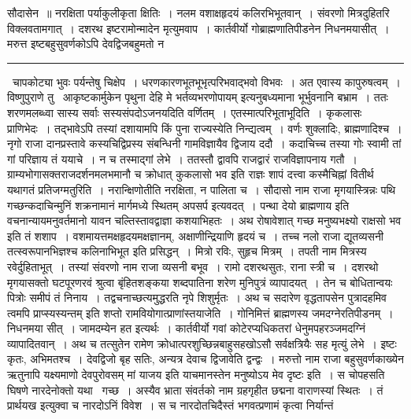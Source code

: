 \documentclass[11pt, openany]{book}
\begin{document}
\newpage

\noindent
सौदासेन~॥ नरक्षिता पर्याकुलीकृता क्षितिः~। नलम वशाक्षहृदयं कलिरभिभूतवान्~। संवरणो मित्रदुहितरि विक्लवतामगात्~। दशरथ इष्टरामोन्मादेन मृत्युमवाप~। कार्तवीर्यो गोब्राह्मणातिपीडनेन निधनमयासीत्~। मरुत्त इष्टबहुसुवर्णकोऽपि देवद्विजबहुमतो न

\vspace{2mm}
\hrule

\noindent
{\ चापकोट्या भुवः पर्यन्तेषु चिक्षेप~। धरणकारणभूतभूभृत्परिभवाद्भवो विभवः~। अत एवास्य कापुरुषत्वम्~। विष्णुपुराणे तु \textendash\ आकृष्टकार्मुकेन पृथुना {\qt देहि मे भर्तव्यभरणोपायम्} इत्यनुबध्यमाना भूर्भुवनानि बभ्राम~। ततः शरणमलब्ध्वा सास्य सर्वाः सस्यसंपदोऽजनयदिति वर्णितम्~। एतस्मात्परिभूताभूदिति~। कृकलासः प्राणिभेदः~। तद्भावेऽपि तस्यां दशायामपि किं पुना राज्यस्येति निन्द्यत्वम्~। वर्णः शुक्लादिः, ब्राह्मणादिश्च~। नृगो राजा दानप्रस्तावे कस्यचिद्विप्रस्य संबन्धिनी गामविज्ञायैव द्विजाय ददौ~। कदाचिच्च तस्या गोः स्वामी तां गां परिज्ञाय तं ययाचे~। न च तस्माद्गां लेभे~। ततस्तौ द्वावपि राजद्वारं राजविज्ञापनाय गतौ~। ग्राम्यभोगासक्तराजदर्शनमलभमानौ च क्रोधात् {\qt कुकलासो भव} इति राज्ञः शापं दत्त्वा कस्मैचिह्नां वितीर्थ यथागतं प्रतिजग्मतुरिति~। नरान्क्षिणोतीति नरक्षिता, न पालिता च~। सौदासो नाम राजा मृगयास्त्रिन्नः पथि गच्छन्कदाचिन्मुनिं शक्रनामानं मार्गमध्ये स्थितम् {\qt अपसर्प} इत्यवदत्~। {\qt पन्था देयो ब्राह्मणाय} इति वचनान्यायमनुवर्तमानो यावन चल्तिस्तावद्वाज्ञा कशयाभिहतः~। अथ रोषावेशात् {\qt गच्छ मनुष्यभक्ष्यो राक्षसो भव} इति तं शशाप~। वशमायत्तमक्षहृदयमक्षज्ञानम्, अक्षाणीन्द्रियाणि हृदयं च~। तच्च नलो राजा द्यूतव्यसनी तत्स्वरूपानभिज्ञश्च कलिनाभिभूत इति प्रसिद्धन्~। मित्रो रविः, सुहृच मित्रम्~। तपती नाम मित्रस्य रवेर्दुहिताभूत्~। तस्यां संवरणो नाम राजा व्यसनी बभूव~। रामो दशरथसुतः, राना स्त्री च~। दशरथो मृगयासक्तो घटपूरणरवं श्रुत्वा बृंहितशङ्कया शब्दपातिना शरेण मुनिपुत्रं व्यापादयत्~। तेन च बोधितान्वयः पित्रोः समीपं तं निनाय~। तद्वचनाच्छत्यमुद्धरति नृपे शिशुर्मृतः~। अथ च {\qt सदारेण वृद्धतापसेन पुत्रादहमिव त्वमपि प्राप्स्यस्यन्तम्} इति शप्तो रामवियोगात्प्राणांस्तयाजेति~। गोनिमित्तं ब्राह्मणस्य जमदग्नेरतिपीडनम्~। निधनमया सीत्~। जामदम्येन हत इत्यर्थः~। कार्तवीर्यो गवां कोटेरप्यधिकतरां धेनुमपहरञ्जमदग्निं व्यापादितवान्~। अथ च तत्सुतेन रामेण क्रोधात्परशुच्छिन्नबाहुसहखोऽसौ सर्वक्षत्रियैः सह मृत्युं लेभे~। इष्टः कृतः, अभिमतश्च~। देवद्विजो बृह सतिः, अन्यत्र देवाच द्विजावेति द्वन्द्वः~। मरुत्तो नाम राजा बहुसुवर्णकाख्येन ऋतुनापि यक्ष्यमाणो देवपुरोवसम् {\qt मां याजय} इति याचमानस्तेन {\qt मनुष्योऽय मेव दृष्टः} इति~। स चोपहसति घिषणे नारदेनोक्तो यथा \textendash\ {\qt गच्छ~। अस्यैव भ्राता संवर्तको नाम ग्रहगृहीत छद्मना वाराणस्यां स्थितः~। तं प्रार्थयख} इत्युक्वा च नारदोऽनिं विवेश~। स च नारदोतचिदैस्तं भगवत्प्रणामं कृत्वा निर्यान्तं}
\end{document}
